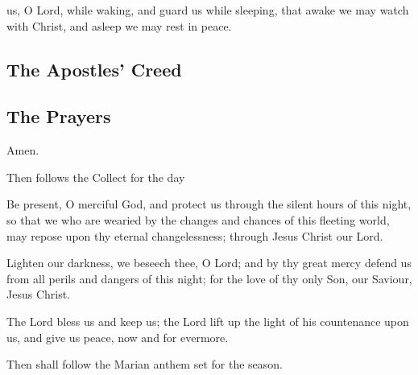  us, O Lord, while waking,
and guard us while sleeping,
that awake we may watch with Christ,
and asleep we may rest in peace.

\subsection{The Apostles' Creed}



\subsection{The Prayers}



Amen.




\begin{rubric}
Then follows the Collect for the day
\end{rubric}

Be present, O merciful God, and protect us through the silent hours of this
night, so that we who are wearied by the changes and chances of this fleeting
world, may repose upon thy eternal changelessness; through Jesus Christ our Lord.\\

Lighten our darkness, we beseech thee, O Lord; and by thy great mercy defend
us from all perils and dangers of this night; for the love of thy only Son, our
Saviour, Jesus Christ.\\


The Lord bless us and keep us; the Lord lift up the light of his countenance upon us, and give us peace, now and for evermore.\\

\begin{rubric}
Then shall follow the Marian anthem set for the season.
\end{rubric}

\clearpage
